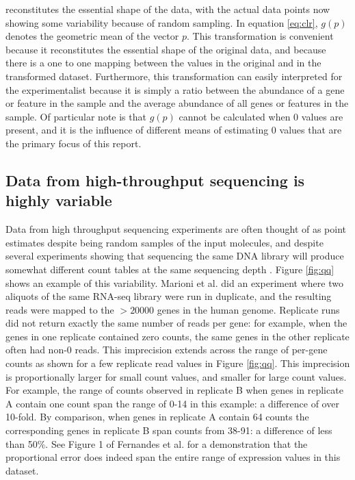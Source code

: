 \documentclass[article]{ajs}\usepackage[]{graphicx}\usepackage[]{color}
\begin{document}
 reconstitutes the essential shape of the data, with the actual data points  now showing some variability because of random sampling. In  equation \ref{eq:clr}, $g(p)$ denotes the geometric mean of the vector $p$. This transformation is convenient because it reconstitutes the essential shape of the original data, and because there is a one to one mapping between the values in the original and in the transformed dataset. Furthermore, this transformation can easily interpreted for the experimentalist because it is simply a ratio between the abundance of a gene or feature in the sample and the average abundance of all genes or features in the sample. Of particular note is that $g(p)$ cannot be calculated when 0 values are present, and it is the influence of different means of estimating  0 values that are the primary focus of this report.  
 


\subsection{Data from high-throughput sequencing is highly variable}
Data from high throughput sequencing experiments are often thought of as point estimates despite being random samples of the input molecules, and despite several experiments showing that sequencing the same DNA library will produce somewhat different count tables at the same sequencing depth \citep{Marioni:2008,Bottomly:2011,Gierlinski:2015aa}.  Figure \ref{fig:qq} shows an example of this variability. Marioni et al. \citeyear{Marioni:2008} did an experiment where two aliquots  of the same RNA-seq library were run in duplicate, and the resulting reads  were mapped to the $>20000$ genes in the human genome. Replicate runs  did not return exactly the same number of reads per gene: for example, when the genes in  one replicate contained zero counts, the same genes in the other replicate  often had non-0 reads. This imprecision extends across the range of per-gene counts as shown for a few replicate read values in Figure \ref{fig:qq}. This imprecision is proportionally larger for small count values, and smaller for large count values. For example, the range of counts observed in replicate B when genes in replicate A contain one count span the range of 0-14 in this example: a difference of over 10-fold. By comparison, when genes in replicate A contain 64 counts the corresponding genes in replicate B span counts from 38-91: a difference of less than 50\%. See Figure 1 of Fernandes et al. \citeyear{fernandes:2013} for a demonstration that the proportional error does indeed span the entire range of expression values in this dataset.
\end{document}
